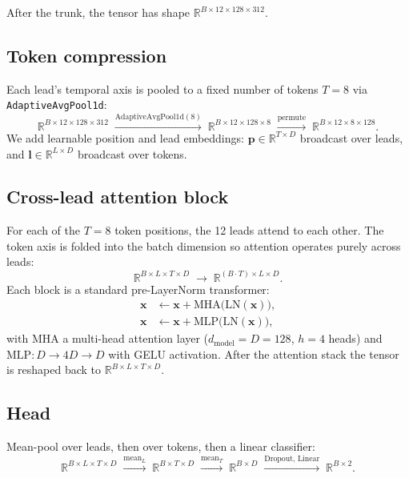 \documentclass[11pt]{article}
\begin{document}
After the trunk, the tensor has shape $\mathbb{R}^{B \times 12 \times 128 \times 312}$.

\subsection{Token compression}

Each lead's temporal axis is pooled to a fixed number of tokens
$T = 8$ via \texttt{AdaptiveAvgPool1d}:
%
\[
  \mathbb{R}^{B \times 12 \times 128 \times 312}
  \;\xrightarrow{\text{AdaptiveAvgPool1d}(8)}\;
  \mathbb{R}^{B \times 12 \times 128 \times 8}
  \;\xrightarrow{\text{permute}}\;
  \mathbb{R}^{B \times 12 \times 8 \times 128}.
\]
%
We add learnable position and lead embeddings:
$\mathbf{p} \in \mathbb{R}^{T \times D}$ broadcast over leads, and
$\mathbf{l} \in \mathbb{R}^{L \times D}$ broadcast over tokens.

\subsection{Cross-lead attention block}

For each of the $T = 8$ token positions, the 12 leads attend to each other.
The token axis is folded into the batch dimension so attention operates purely
across leads:
%
\[
  \mathbb{R}^{B \times L \times T \times D}
  \;\to\;
  \mathbb{R}^{(B \cdot T) \times L \times D}.
\]
%
Each block is a standard pre-LayerNorm transformer:
%
\begin{align*}
  \mathbf{x} &\leftarrow \mathbf{x} + \text{MHA}\!\bigl(\text{LN}(\mathbf{x})\bigr), \\
  \mathbf{x} &\leftarrow \mathbf{x} + \text{MLP}\!\bigl(\text{LN}(\mathbf{x})\bigr),
\end{align*}
%
with $\text{MHA}$ a multi-head attention layer ($d_{\text{model}} = D = 128$,
$h = 4$ heads) and $\text{MLP}: D \to 4D \to D$ with GELU activation. After the
attention stack the tensor is reshaped back to
$\mathbb{R}^{B \times L \times T \times D}$.

\subsection{Head}

Mean-pool over leads, then over tokens, then a linear classifier:
%
\[
  \mathbb{R}^{B \times L \times T \times D}
  \;\xrightarrow{\text{mean}_L}\;
  \mathbb{R}^{B \times T \times D}
  \;\xrightarrow{\text{mean}_T}\;
  \mathbb{R}^{B \times D}
  \;\xrightarrow{\text{Dropout, Linear}}\;
  \mathbb{R}^{B \times 2}.
\]
\end{document}
